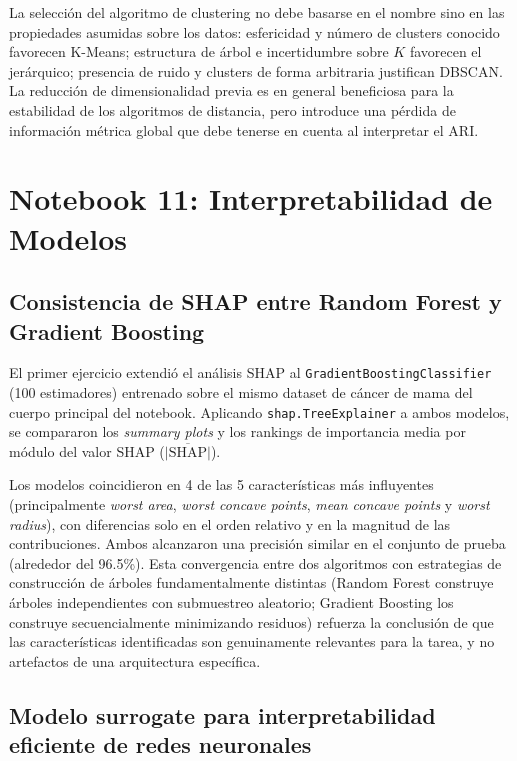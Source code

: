 \documentclass[12pt, a4paper]{article}
\begin{document}
La selección del algoritmo de clustering no debe basarse en el nombre sino en las propiedades asumidas sobre los datos: esfericidad y número de clusters conocido favorecen K-Means; estructura de árbol e incertidumbre sobre $K$ favorecen el jerárquico; presencia de ruido y clusters de forma arbitraria justifican DBSCAN. La reducción de dimensionalidad previa es en general beneficiosa para la estabilidad de los algoritmos de distancia, pero introduce una pérdida de información métrica global que debe tenerse en cuenta al interpretar el ARI.

\section{Notebook 11: Interpretabilidad de Modelos}

\subsection{Consistencia de SHAP entre Random Forest y Gradient Boosting}

El primer ejercicio extendió el análisis SHAP al \texttt{GradientBoostingClassifier} (100 estimadores) entrenado sobre el mismo dataset de cáncer de mama del cuerpo principal del notebook. Aplicando \texttt{shap.TreeExplainer} a ambos modelos, se compararon los \textit{summary plots} y los rankings de importancia media por módulo del valor SHAP ($\overline{|\text{SHAP}|}$).

Los modelos coincidieron en 4 de las 5 características más influyentes (principalmente \textit{worst area}, \textit{worst concave points}, \textit{mean concave points} y \textit{worst radius}), con diferencias solo en el orden relativo y en la magnitud de las contribuciones. Ambos alcanzaron una precisión similar en el conjunto de prueba (alrededor del 96.5\%). Esta convergencia entre dos algoritmos con estrategias de construcción de árboles fundamentalmente distintas (Random Forest construye árboles independientes con submuestreo aleatorio; Gradient Boosting los construye secuencialmente minimizando residuos) refuerza la conclusión de que las características identificadas son genuinamente relevantes para la tarea, y no artefactos de una arquitectura específica.

\subsection{Modelo surrogate para interpretabilidad eficiente de redes neuronales}
\end{document}
